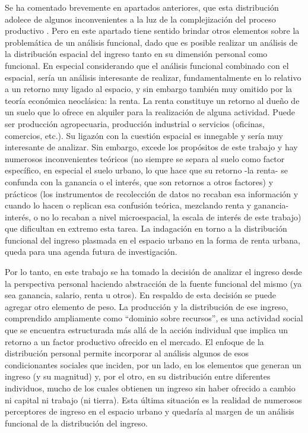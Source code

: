 Se ha comentado brevemente en apartados anteriores, que esta distribución adolece de algunos inconvenientes a la luz de la complejización del proceso productivo \cite{altimir1986}. Pero en este apartado tiene sentido brindar otros elementos sobre la problemática de un análisis funcional, dado que es posible realizar un análisis de la distribución espacial del ingreso tanto en su dimensión personal como funcional. En especial considerando que el análisis funcional combinado con el espacial, sería un análisis interesante de realizar, fundamentalmente en lo relativo a un retorno muy ligado al espacio, y sin embargo también muy omitido por la teoría económica neoclásica: la renta. La renta constituye un retorno al dueño de un suelo que lo ofrece en alquiler para la realización de alguna actividad. Puede ser producción agropecuaria, producción industrial o servicios (oficinas, comercios, etc.). Su ligazón con la cuestión espacial es innegable y sería muy interesante de analizar. Sin embargo, excede los propósitos de este trabajo y hay numerosos inconvenientes teóricos (no siempre se separa al suelo como factor específico, en especial el suelo urbano, lo que hace que su retorno -la renta- se confunda con la ganancia o el interés, que son retornos a otros factores) y prácticos (los instrumentos de recolección de datos no recaban esa información y cuando lo hacen o replican esa confusión teórica, mezclando renta y ganancia-interés, o no lo recaban a nivel microespacial, la escala de interés de este trabajo) que dificultan en extremo esta tarea. La indagación en torno a la distribución funcional del ingreso  plasmada en el espacio urbano en la forma de renta urbana, queda para una agenda futura de investigación.
	
Por lo tanto, en este trabajo se ha tomado la decisión de analizar el ingreso desde la perspectiva personal haciendo abstracción de la fuente funcional del mismo (ya sea ganancia, salario, renta u otros). En respaldo de esta decisión se puede agregar otro elemento de peso. La producción y la distribución de ese ingreso, comprendido ampliamente como “dominio sobre recursos”, es una actividad social que se encuentra estructurada más allá de la acción individual que implica un retorno a un factor productivo ofrecido en el mercado. El enfoque de la distribución personal permite incorporar al análisis algunos de esos condicionantes sociales que inciden, por un lado, en los elementos que generan un ingreso (y su magnitud) y, por el otro, en su distribución entre diferentes individuos, mucho de los cuales obtienen un ingreso sin haber ofrecido a cambio ni capital ni trabajo (ni tierra). Esta última situación es la realidad de numerosos perceptores de ingreso en el espacio urbano y quedaría al margen de un análisis funcional de la distribución del ingreso.
	

